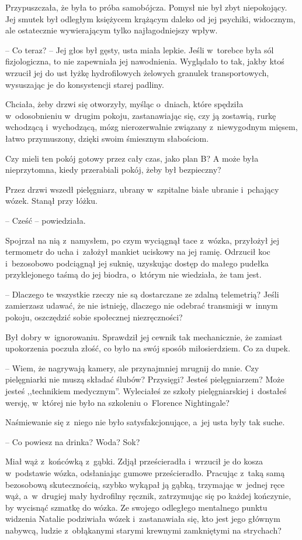 \documentclass[oneside,polish,11pt,sfheadings]{mwbk}
\begin{document}
Przypuszczała, że była to próba samobójcza. Pomysł nie był zbyt
niepokojący. Jej smutek był odległym księżycem krążącym daleko od jej
psychiki, widocznym, ale ostatecznie wywierającym tylko najłagodniejszy
wpływ.

-- Co teraz? -- Jej głos był gęsty, usta miała lepkie. Jeśli w~torebce
była sól fizjologiczna, to nie zapewniała jej nawodnienia. Wyglądało to
tak, jakby ktoś wrzucił jej do ust łyżkę hydrofilowych żelowych granulek
transportowych, wysuszając je do konsystencji starej padliny.

Chciała, żeby drzwi się otworzyły, myśląc o~dniach, które spędziła w~odosobnieniu w~drugim pokoju, zastanawiając się, czy ją zostawią, rurkę
wchodzącą i~wychodzącą, mózg nierozerwalnie związany z~niewygodnym
mięsem, łatwo przymuszony, dzięki swoim śmiesznym słabościom.

Czy mieli ten pokój gotowy przez cały czas, jako plan B? A może była
nieprzytomna, kiedy przerabiali pokój, żeby był bezpieczny?

Przez drzwi wszedł pielęgniarz, ubrany w~szpitalne białe ubranie i~pchający wózek. Stanął przy łóżku.

-- Cześć -- powiedziała.

Spojrzał na nią z~namysłem, po czym wyciągnął tace z~wózka, przyłożył
jej termometr do ucha i~założył mankiet uciskowy na jej ramię. Odrzucił
koc i~bezosobowo podciągnął jej suknię, uzyskując dostęp do małego
pudełka przyklejonego taśmą do jej biodra, o~którym nie wiedziała, że
tam jest.

-- Dlaczego te wszystkie rzeczy nie są dostarczane ze zdalną telemetrią?
Jeśli zamierzasz udawać, że nie istnieję, dlaczego nie odebrać
transmisji w~innym pokoju, oszczędzić sobie społecznej niezręczności?

Był dobry w~ignorowaniu. Sprawdził jej cewnik tak mechanicznie, że
zamiast upokorzenia poczuła złość, co było na swój sposób miłosierdziem.
Co za dupek.

-- Wiem, że nagrywają kamery, ale przynajmniej mrugnij do mnie. Czy
pielęgniarki nie muszą składać ślubów? Przysięgi? Jesteś pielęgniarzem?
Może jesteś ,,technikiem medycznym''. Wyleciałeś ze szkoły
pielęgniarskiej i~dostałeś wersję, w~której nie było na szkoleniu o~Florence Nightingale?

Naśmiewanie się z~niego nie było satysfakcjonujące, a~jej usta były tak
suche.

-- Co powiesz na drinka? Woda? Sok?

Miał wąż z~końcówką z~gąbki. Zdjął prześcieradła i~wrzucił je do kosza w~podstawie wózka, odsłaniając gumowe prześcieradło. Pracując z~taką samą
bezosobową skutecznością, szybko wykąpał ją gąbką, trzymając w~jednej
ręce wąż, a~w~drugiej mały hydrofilny ręcznik, zatrzymując się po każdej
kończynie, by wycisnąć szmatkę do wózka. Ze swojego odległego mentalnego
punktu widzenia Natalie podziwiała wózek i~zastanawiała się, kto jest
jego głównym nabywcą, ludzie z~obłąkanymi starymi krewnymi zamkniętymi
na strychach?
\end{document}
